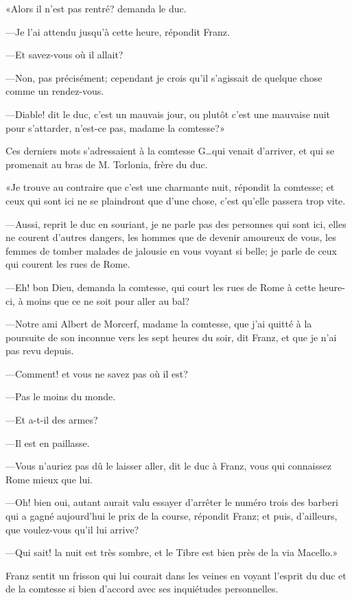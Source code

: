 «Alors il n'est pas rentré? demanda le duc. 

—Je l'ai attendu jusqu'à cette heure, répondit Franz. 

—Et savez-vous où il allait? 

—Non, pas précisément; cependant je crois qu'il s'agissait de quelque chose comme un rendez-vous. 

—Diable! dit le duc, c'est un mauvais jour, ou plutôt c'est une mauvaise nuit pour s'attarder, n'est-ce pas, madame la comtesse?» 

Ces derniers mots s'adressaient à la comtesse G\dots qui venait d'arriver, et qui se promenait au bras de M. Torlonia, frère du duc. 

«Je trouve au contraire que c'est une charmante nuit, répondit la comtesse; et ceux qui sont ici ne se plaindront que d'une chose, c'est qu'elle passera trop vite. 

—Aussi, reprit le duc en souriant, je ne parle pas des personnes qui sont ici, elles ne courent d'autres dangers, les hommes que de devenir amoureux de vous, les femmes de tomber malades de jalousie en vous voyant si belle; je parle de ceux qui courent les rues de Rome. 

—Eh! bon Dieu, demanda la comtesse, qui court les rues de Rome à cette heure-ci, à moins que ce ne soit pour aller au bal? 

—Notre ami Albert de Morcerf, madame la comtesse, que j'ai quitté à la poursuite de son inconnue vers les sept heures du soir, dit Franz, et que je n'ai pas revu depuis. 

—Comment! et vous ne savez pas où il est? 

—Pas le moins du monde. 

—Et a-t-il des armes? 

—Il est en paillasse. 

—Vous n'auriez pas dû le laisser aller, dit le duc à Franz, vous qui connaissez Rome mieux que lui. 

—Oh! bien oui, autant aurait valu essayer d'arrêter le numéro trois des barberi qui a gagné aujourd'hui le prix de la course, répondit Franz; et puis, d'ailleurs, que voulez-vous qu'il lui arrive? 

—Qui sait! la nuit est très sombre, et le Tibre est bien près de la via Macello.» 

Franz sentit un frisson qui lui courait dans les veines en voyant l'esprit du duc et de la comtesse si bien d'accord avec ses inquiétudes personnelles. 

